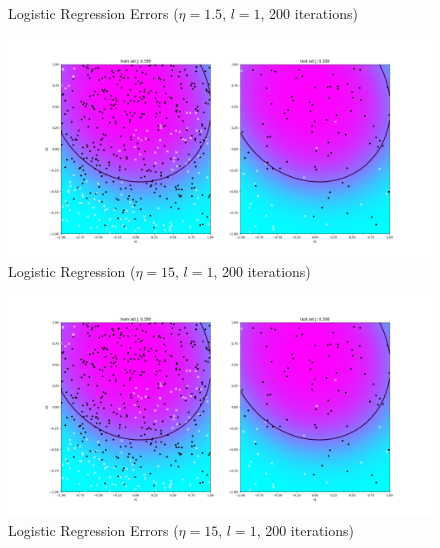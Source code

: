 \documentclass[12pt,halfline,a4paper]{ouparticle}
\begin{document}
\begin{enumerate}
\begin{figure}[H]
	    \caption{Logistic Regression Errors ($\eta = 1.5$, $l = 1$, 200
	    iterations)}
	\end{figure}
	\begin{figure}[H]
  	\centering
	        \includegraphics[width=\textwidth]{figures/logreg_d2_it200_15_.png}
	    \caption{Logistic Regression ($\eta = 15$, $l = 1$, 200 iterations)}
	\end{figure}
	\begin{figure}[H]
  	\centering
	        \includegraphics[width=\textwidth]{figures/logreg_d2_it200_15_.png}
	    \caption{Logistic Regression Errors ($\eta = 15$, $l = 1$, 200
	    iterations)}
	\end{figure}
	

\end{enumerate}
\end{document}

